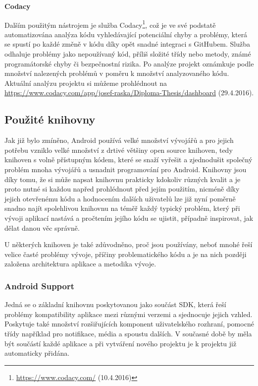 \documentclass[czech,master,public,dept460,male,java,cpdeclaration]{diploma}
\begin{document}
\noindent
\textbf{Codacy}
\nopagebreak

Dalším použitým nástrojem je služba Codacy\footnote{\url{https://www.codacy.com/} (10.4.2016)}, což je ve své podstatě
automatizována analýza kódu vyhledávající potenciální chyby a problémy, která se spustí po každé změně v kódu
díky opět snadné integraci s GitHubem. Služba odhaluje problémy jako nepoužívaný kód, příliš složité
třídy nebo metody, známé programátorské chyby či bezpečnostní rizika. Po analýze projekt oznámkuje podle
množství nalezených problémů v poměru k množství analyzovaného kódu. Aktuální analýzu projektu si můžeme prohlédnout
na \url{https://www.codacy.com/app/josef-raska/Diploma-Thesis/dashboard} (29.4.2016).

\subsection{Použité knihovny}
Jak již bylo zmíněno, Android používá velké množství vývojářů a pro jejich potřebu vzniklo velké množství
z drtivé většiny open source knihoven, tedy knihoven s volně přístupným kódem,
 které se snaží vyřešit a zjednodušit společný problém mnoha vývojářů
a usnadnit programování pro Android. Knihovny jsou díky tomu, že si může napsat knihovnu prakticky kdokoliv
různých kvalit a je proto nutné si každou napřed prohlédnout před jejím použitím, nicméně díky jejich
otevřenému kódu a hodnocením dalších uživatelů lze již nyní poměrně snadno najít spolehlivou knihovnu na téměř každý
typický problém, který při vývoji aplikací nastává a pročtením jejího kódu se ujistit, případně inspirovat,
jak dělat danou věc správně.

U některých knihoven je také zdůvodněno, proč jsou používány,
neboť mnohé řeší velice časté problémy vývoje, příčiny problematického kódu a je na nich později založena
architektura aplikace a metodika vývoje.

\subsubsection{Android Support}\label{androidsupport}
Jedná se o základní knihovnu poskytovanou jako součást SDK, která řeší problémy kompatibility aplikace
mezi různými verzemi a sjednocuje jejich vzhled. Poskytuje také množství rozšiřujících komponent uživatelského rozhraní,
pomocné třídy například pro notifikace, média a spoustu dalších. V současné době by měla být součástí každé
aplikace a při vytváření nového projektu je k projektu již automaticky přidána.
\end{document}
